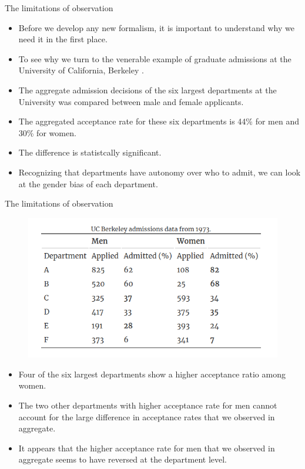 \documentclass[handout]{beamer}
\begin{document}
\begin{frame}{The limitations of observation}
\scriptsize{
\begin{itemize}
\item Before we develop any new formalism, it is important to understand why we need it in the first place.
\item To see why we turn to the venerable example of graduate admissions at the University of California, Berkeley  \cite{bickel1975sex}.

\item The aggregate admission decisions of the six largest departments at the University was compared between male and female applicants. 
\item The aggregated acceptance rate for these six departments is 44\% for men and 30\% for women.

\item The difference is statistcally significant. 
\item Recognizing that departments have autonomy over who to admit, we can look at the gender bias of each department.


\end{itemize}

} 

\end{frame}

\begin{frame}{The limitations of observation}
\scriptsize{
\begin{figure}[h!]
	\centering
	\includegraphics[scale=0.4]{pics/berkley.png}
\end{figure}

\begin{itemize}

\item Four of the six largest departments show a higher acceptance ratio among women.
\item The two other departments with higher acceptance rate for men cannot account for the large difference in acceptance rates that we observed in aggregate. 
\item It appears that the higher acceptance rate for men that we observed in aggregate seems to have reversed at the department level.


\end{itemize}

} 

\end{frame}
\end{document}

